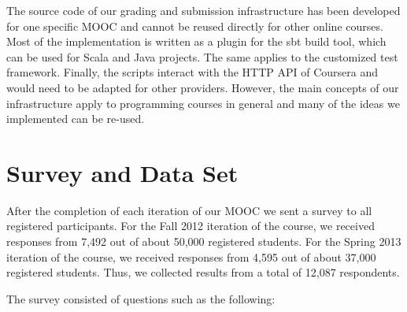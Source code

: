 \documentclass{sig-alternate}
\begin{document}
The source code of our grading and submission infrastructure has been developed
for one specific MOOC and cannot be reused directly for other online courses.
Most of the implementation is written as a plugin for the sbt build tool, which
can be used for Scala and Java projects. The same applies to the customized test
framework. Finally, the scripts interact with the HTTP API of Coursera and would
need to be adapted for other providers. However, the main concepts of our
infrastructure apply to programming courses in general and many of the ideas
we implemented can be re-used.




\section{Survey and Data Set}

After the completion of each iteration of our MOOC we sent a survey to all
registered participants. For the Fall 2012 iteration of the course, we
received responses from 7,492 out of about 50,000 registered students. For the
Spring 2013 iteration of the course, we received responses from 4,595 out of
about 37,000 registered students. Thus, we collected results from a total of
12,087 respondents.

The survey consisted of questions such as the following:
\end{document}
